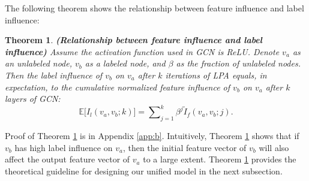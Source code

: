 \documentclass{article}
\newtheorem{theorem}{Theorem}
\begin{document}
		The following theorem shows the relationship between feature influence and label influence:
		
		\begin{theorem}
		\label{thm:influence}
			\rm\textbf{(Relationship between feature influence and label influence)}
			Assume the activation function used in GCN is ReLU.
			Denote $v_a$ as an unlabeled node, $v_b$ as a labeled node, and $\beta$ as the fraction of unlabeled nodes.
			Then the label influence of $v_b$ on $v_a$ after $k$ iterations of LPA equals, in expectation, to the cumulative normalized feature influence of $v_b$ on $v_a$ after $k$ layers of GCN:
			\begin{equation}
				\mathbb E \big[ I_l(v_a, v_b; k) \big] = \sum\nolimits_{j=1}^k \beta^j \tilde I_f(v_a, v_b; j).
			\end{equation}
		\end{theorem}
		
		Proof of Theorem \ref{thm:influence} is in Appendix \ref{app:b}.
		Intuitively, Theorem \ref{thm:influence} shows that if $v_b$ has high label influence on $v_a$, then the initial feature vector of $v_b$ will also affect the output feature vector of $v_a$ to a large extent.
		Theorem \ref{thm:influence} provides the theoretical guideline for designing our unified model in the next subsection.
		
		
\end{document}
